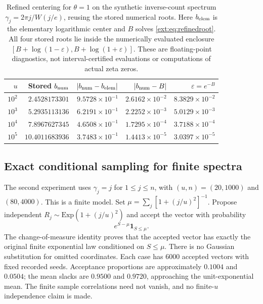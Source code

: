 \documentclass[11pt]{article}
\theoremstyle{definition}
\theoremstyle{remark}
\begin{document}
\begin{table}[htbp]
\centering
\small
\begin{tabular}{rrrrr}
\hline
$u$ & Stored $b_{\rm num}$ & $|b_{\rm num}-b_{\rm elem}|$
    & $|b_{\rm num}-B|$ & $\varepsilon=e^{-B}$\\
\hline
$10^2$ & $2.4528173301$ & $9.5728\times10^{-1}$
       & $2.6162\times10^{-2}$ & $8.3829\times10^{-2}$\\
$10^3$ & $5.2935113136$ & $6.2191\times10^{-1}$
       & $2.2252\times10^{-3}$ & $5.0129\times10^{-3}$\\
$10^4$ & $7.8967627345$ & $4.6508\times10^{-1}$
       & $1.7295\times10^{-4}$ & $3.7188\times10^{-4}$\\
$10^5$ & $10.4011683936$ & $3.7483\times10^{-1}$
       & $1.4413\times10^{-5}$ & $3.0397\times10^{-5}$\\
\hline
\end{tabular}
\caption{Refined centering for $\theta=1$ on the synthetic inverse-count
spectrum $\gamma_j=2\pi j/W(j/e)$, reusing the stored numerical roots.
Here $b_{\rm elem}$ is the elementary logarithmic center and $B$ solves
\eqref{ext:eq:refinedroot}.  All four stored roots lie inside the
numerically evaluated enclosure
$[B+\log(1-\varepsilon),B+\log(1+\varepsilon)]$.
These are floating-point diagnostics, not interval-certified evaluations
or computations of actual zeta zeros.}
\label{ext:tab:refinedcenter}
\end{table}


\subsection{Exact conditional sampling for finite spectra}

The second experiment uses $\gamma_j=j$ for $1\le j\le n$, with
$(u,n)=(20,1000)$ and $(80,4000)$. This is a finite model. Set
$\mu=\sum_j[1+(j/u)^2]^{-1}$. Propose independent
$R_j\sim\mathrm{Exp}(1+(j/u)^2)$ and accept the vector with probability
\[
 e^{S-\mu}\mathbf1_{S\le\mu}.
\]
The change-of-measure identity proves that the accepted vector has
exactly the original finite exponential law conditioned on $S\le\mu$.
There is no Gaussian substitution for omitted coordinates. Each case has
6000 accepted vectors with fixed recorded seeds. Acceptance proportions
are approximately $0.1004$ and $0.0504$; the mean slacks are $0.9500$
and $0.9720$, approaching the unit-exponential mean. The finite sample
correlations need not vanish, and no finite-$u$ independence claim is made.
\end{document}
